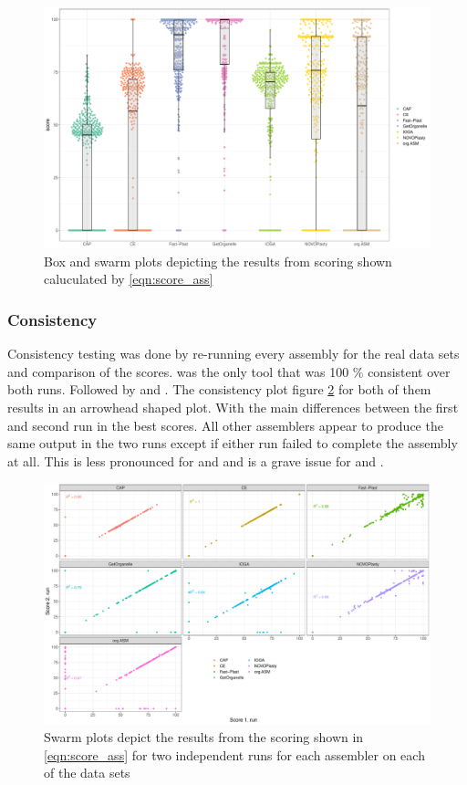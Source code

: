 \begin{figure}[H]
\centering
\includegraphics[height=.45\textheight, width=.95\textwidth]{Figures/swarm}
\decoRule
\caption[Scores of assemblies from real data sets]{Box and swarm plots depicting the results from scoring shown caluculated by \ref{eqn:score_ass}}
\label{fig:swarm}
\end{figure}

\subsubsection{Consistency}

Consistency testing was done by re-running every assembly for the real data sets and comparison of the
scores. \ce was the only tool that was 100 \% consistent over both runs. Followed by \fp and \np. The
consistency plot figure \ref{fig:consisplot} for both of them results in an arrowhead shaped plot. With the
main differences between the first and second run in the best scores. All other assemblers appear to produce
the same output in the two runs except if either run failed to complete the assembly at all. This is less
pronounced for \cassp and \go and is a grave issue for \oa and \ioga.

\begin{figure}[H]
\centering
\includegraphics[height=.45\textheight, width=.95\textwidth]{Figures/repro}
\decoRule
\caption[Comparison between two runs with the same assembler for consistency testing ]{Swarm plots depict the
  results from the scoring shown in \ref{eqn:score_ass} for two independent runs for each assembler on each of
  the data sets}
\label{fig:consisplot}
\end{figure}



